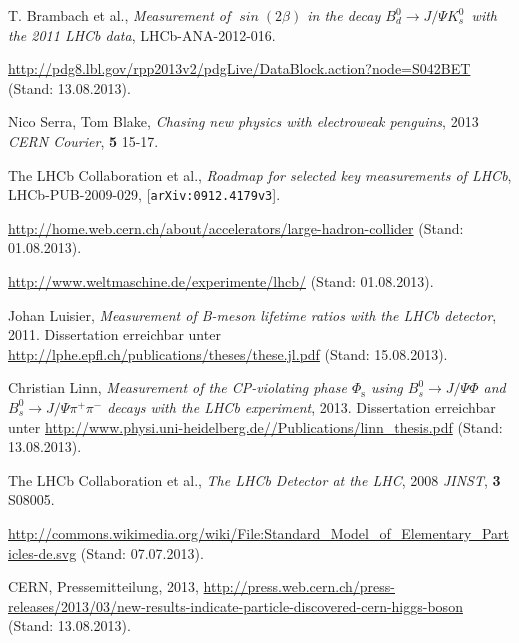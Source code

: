 \documentclass[ a4paper,
                12pt, 
                twoside, 
                chapterprefix,
                BCOR=17mm,
                bibtotoc,
                listtotoc,
              ]{scrreprt}
\newcommand{\Decaychannel}{$B_d^0 \rightarrow J/\Psi K_s^0$}
\begin{document}

\pagestyle{headings}

\tableofcontents









\begin{thebibliography}{---}
 T. Brambach et al., \textit{Measurement of $\mathit{\sin(2\beta)}$ in the decay \Decaychannel\ with the 2011 LHCb data}, LHCb-ANA-2012-016.

 \url{http://pdg8.lbl.gov/rpp2013v2/pdgLive/DataBlock.action?node=S042BET} (Stand: 13.08.2013).

 Nico Serra, Tom Blake, \textit{Chasing new physics with electroweak penguins}, 2013 \textit{CERN Courier}, \textbf{5} 15-17.

 The LHCb Collaboration et al., \textit{Roadmap for selected key measurements of LHCb}, LHCb-PUB-2009-029, [\texttt{arXiv:0912.4179v3}]. 

 \url{http://home.web.cern.ch/about/accelerators/large-hadron-collider} (Stand: 01.08.2013).

 \url{http://www.weltmaschine.de/experimente/lhcb/} (Stand: 01.08.2013).

 Johan Luisier, \textit{Measurement of B-meson lifetime ratios with the LHCb detector}, 2011. Dissertation erreichbar unter \url{http://lphe.epfl.ch/publications/theses/these.jl.pdf} (Stand: 15.08.2013).

 Christian Linn, \textit{Measurement of the CP-violating phase $\Phi_{\text{s}}$ using $B_s^0 \rightarrow J/\Psi\Phi$ and $B_s^0 \rightarrow J/\Psi\pi^+\pi^-$ decays with the LHCb experiment}, 2013. Dissertation erreichbar unter \url{http://www.physi.uni-heidelberg.de//Publications/linn_thesis.pdf} (Stand: 13.08.2013).

 The LHCb Collaboration et al., \textit{The LHCb Detector at the LHC}, 2008 \textit{JINST}, \textbf{3} S08005.

 \url{http://commons.wikimedia.org/wiki/File:Standard_Model_of_Elementary_Particles-de.svg} (Stand: 07.07.2013).

 CERN, Pressemitteilung, 2013, \url{http://press.web.cern.ch/press-releases/2013/03/new-results-indicate-particle-discovered-cern-higgs-boson} (Stand: 13.08.2013).


\end{thebibliography}
\end{document}
